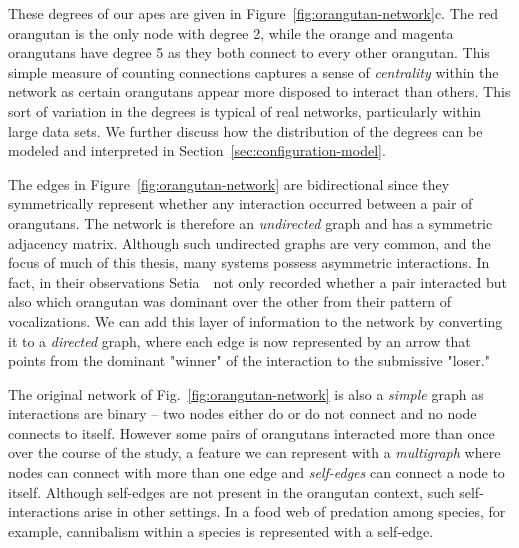 These degrees of our apes are given in Figure~\ref{fig:orangutan-network}c. The red orangutan is the only node with degree 2, while the orange and magenta orangutans have degree 5 as they both connect to every other orangutan. This simple measure of counting connections captures a sense of \emph{centrality} within the network as certain orangutans appear more disposed to interact than others. This sort of variation in the degrees is typical of real networks, particularly within large data sets. We further discuss how the distribution of the degrees can be modeled and interpreted in Section~\ref{sec:configuration-model}.

The edges in Figure~\ref{fig:orangutan-network} are bidirectional since they symmetrically represent whether any interaction occurred between a pair of orangutans. The network is therefore an \emph{undirected} graph and has a symmetric adjacency matrix. Although such undirected graphs are very common, and the focus of much of this thesis, many systems possess asymmetric interactions. In fact, in their observations Setia~\etal~not only recorded whether a pair interacted but also which orangutan was dominant over the other from their pattern of vocalizations. We can add this layer of information to the network by converting it to a \emph{directed} graph, where each edge is now represented by an arrow that points from the dominant "winner" of the interaction to the submissive "loser." 

The original network of Fig.~\ref{fig:orangutan-network} is also a \emph{simple} graph as interactions are binary -- two nodes either do or do not connect and no node connects to itself. However some pairs of orangutans interacted more than once over the course of the study, a feature we can represent with a \emph{multigraph} where nodes can connect with more than one edge and \emph{self-edges} can connect a node to itself. Although self-edges are not present in the orangutan context, such self-interactions arise in other settings. In a food web of predation among species, for example, cannibalism within a species is represented with a self-edge. 


